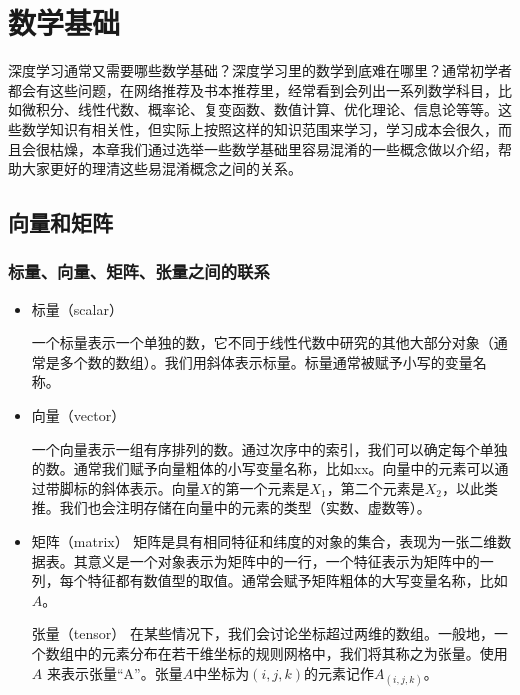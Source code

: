 

\chapter{数学基础}

深度学习通常又需要哪些数学基础？深度学习里的数学到底难在哪里？通常初学者都会有这些问题，在网络推荐及书本推荐里，经常看到会列出一系列数学科目，比如微积分、线性代数、概率论、复变函数、数值计算、优化理论、信息论等等。这些数学知识有相关性，但实际上按照这样的知识范围来学习，学习成本会很久，而且会很枯燥，本章我们通过选举一些数学基础里容易混淆的一些概念做以介绍，帮助大家更好的理清这些易混淆概念之间的关系。

\section{向量和矩阵}

\subsection{标量、向量、矩阵、张量之间的联系}

\begin{itemize}\itemsep0em
		\item 标量（scalar）

			一个标量表示一个单独的数，它不同于线性代数中研究的其他大部分对象（通常是多个数的数组）。我们用斜体表示标量。标量通常被赋予小写的变量名称。 

		\item 向量（vector）

			一个向量表示一组有序排列的数。通过次序中的索引，我们可以确定每个单独的数。通常我们赋予向量粗体的小写变量名称，比如xx。向量中的元素可以通过带脚标的斜体表示。向量$X$的第一个元素是$X_1$，第二个元素是$X_2$，以此类推。我们也会注明存储在向量中的元素的类型（实数、虚数等）。

		\item 矩阵（matrix）
			矩阵是具有相同特征和纬度的对象的集合，表现为一张二维数据表。其意义是一个对象表示为矩阵中的一行，一个特征表示为矩阵中的一列，每个特征都有数值型的取值。通常会赋予矩阵粗体的大写变量名称，比如$A$。

		张量（tensor）
		在某些情况下，我们会讨论坐标超过两维的数组。一般地，一个数组中的元素分布在若干维坐标的规则网格中，我们将其称之为张量。使用 $A$ 来表示张量“A”。张量$A$中坐标为$(i,j,k)$的元素记作$A_{(i,j,k)}$。

\end{itemize}

